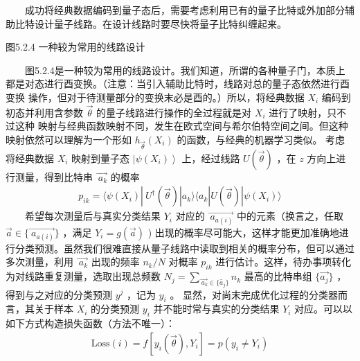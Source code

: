 \documentclass[a4paper,11pt,english]{sphinxmanual}
\begin{document}
\sphinxAtStartPar
  成功将经典数据编码到量子态后，需要考虑利用已有的量子比特或外加部分辅助比特设计量子线路。在设计线路时要尽快将量子比特纠缠起来。


\begin{center}图5.2.4 一种较为常用的线路设计
\end{center}
\sphinxAtStartPar
  图5.2.4是一种较为常用的线路设计。我们知道，所谓的各种量子门，本质上都是对态进行酉变换。（注意：当引入辅助比特时，线路对总的量子态依然进行酉变换 操作，但对于待测量部分的变换末必是酉的。）所以，将经典数据  \(X_{i}\) 编码到初态并利用含参数 \(\vec{\theta}\) 的量子线路进行操作的全过程就是对  \(X_{i}\) 进行了映射，只不过这种 映射与经典函数映射不同，发生在欧式空间与希尔伯特空间之间。但这种映射依然可以理解为一个形如 \(h_{\vec{\theta}}\left(X_{i}\right)\) 的函数，与经典的机器学习类似。 考虑将经典数据  \(X_{i}\) 映射到量子态  \(\left|\psi\left(X_{i}\right)\right\rangle\) 上，经过线路  \(U(\vec{\theta})\) ，在  \({z}\) 方向上进行测量，得到比特串 \(\vec{\ a_{k}}\) 的概率
\begin{equation*}
\begin{split}p_{i k}=\langle\psi\left(X_{i}\right)|\ U^{\dagger}(\vec{\theta}) | a_{k}\rangle\langle a_{k}|U(\vec{\theta})| \psi\left(X_{i}\right)\rangle\end{split}
\end{equation*}
\sphinxAtStartPar
  希望每次测量后与真实分类结果 \(Y_{i}\) 对应的  \(\vec{\ a_{a(i)}}\) 中的元素（换言之，任取 \(\vec{a} \in\{\vec{\ a_{a(i)}}\}\) ，满足  \(Y_{i}=g(\vec{a})\) ) 出现的概率尽可能大，这样才能更加准确地进行分类预测。虽然我们很难直接从量子线路中读取到相关的概率分布，但可以通过多次测量，利用 \(\vec{\ a_{k}}\) 出现的频率  \(n_{k} / N\) 对概率  \(p_{i k}\) 进行估计。这样，待办事项转化为对线路重复测量，选取出现总频数 \(N_{j}=\sum_{\vec{\ a_{k}} \in\{\tilde{a_{j}}\}} n_{k}\) 最高的比特串组 \(\{\vec {a_{j}}\}\) ，得到与之对应的分类预测 \(y^{j}\) ，记为  \(y_{i}\) 。 显然，对尚末完成优化过程的分类器而言，其关于样本  \(X_{i}\) 的分类预测  \(y_{i}\) 并不能时常与真实的分类结果  \(Y_{i}\) 对应。可以以如下方式构造损失函数（方法不唯一）：
\begin{equation*}
\begin{split}\text{Loss}(i)=f\left[y_{i}(\vec{\theta}), Y_{i}\right]=p\left(y_{i} \neq Y_{i}\right)\end{split}
\end{equation*}
\end{document}
